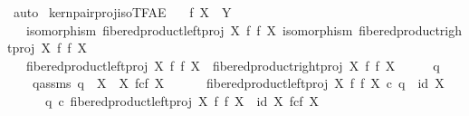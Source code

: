 \begin{isabellebody}
\ auto\isanewline
{}\isamarkupfalse%
%
\endisatagproof
{\isafoldproof}%
%
\isadelimproof
\isanewline
%
\endisadelimproof
\isanewline
{}\isamarkupfalse%
\ kern{\isacharunderscore}{\kern0pt}pair{\isacharunderscore}{\kern0pt}proj{\isacharunderscore}{\kern0pt}iso{\isacharunderscore}{\kern0pt}TFAE{}{\isacharcolon}{\kern0pt}\isanewline
\ \ \ {\isachardoublequoteopen}f{\isacharcolon}{\kern0pt}\ X\ {\isasymrightarrow}\ Y{\isachardoublequoteclose}\isanewline
\ \ \ {\isachardoublequoteopen}isomorphism\ {\isacharparenleft}{\kern0pt}fibered{\isacharunderscore}{\kern0pt}product{\isacharunderscore}{\kern0pt}left{\isacharunderscore}{\kern0pt}proj\ X\ f\ f\ X{\isacharparenright}{\kern0pt}{\isachardoublequoteclose}\ {\isachardoublequoteopen}isomorphism\ {\isacharparenleft}{\kern0pt}fibered{\isacharunderscore}{\kern0pt}product{\isacharunderscore}{\kern0pt}right{\isacharunderscore}{\kern0pt}proj\ X\ f\ f\ X{\isacharparenright}{\kern0pt}{\isachardoublequoteclose}\isanewline
\ \ \ {\isachardoublequoteopen}fibered{\isacharunderscore}{\kern0pt}product{\isacharunderscore}{\kern0pt}left{\isacharunderscore}{\kern0pt}proj\ X\ f\ f\ X\ {\isacharequal}{\kern0pt}\ fibered{\isacharunderscore}{\kern0pt}product{\isacharunderscore}{\kern0pt}right{\isacharunderscore}{\kern0pt}proj\ X\ f\ f\ X{\isachardoublequoteclose}\isanewline
%
\isadelimproof
%
\endisadelimproof
%
\isatagproof
{}\isamarkupfalse%
\ {\isacharminus}{\kern0pt}\isanewline
\ \ \isamarkupfalse%
\ q{}\ \ \isanewline
\ \ \ \ q{}{\isacharunderscore}{\kern0pt}assms{\isacharcolon}{\kern0pt}\ {\isachardoublequoteopen}q{}\ {\isacharcolon}{\kern0pt}\ X\ {\isasymrightarrow}\ X\ \isactrlbsub f\isactrlesub {\isasymtimes}\isactrlsub c\isactrlbsub f\isactrlesub \ X{\isachardoublequoteclose}\isanewline
\ \ \ \ \ \ {\isachardoublequoteopen}fibered{\isacharunderscore}{\kern0pt}product{\isacharunderscore}{\kern0pt}left{\isacharunderscore}{\kern0pt}proj\ X\ f\ f\ X\ {\isasymcirc}\isactrlsub c\ q{}\ {\isacharequal}{\kern0pt}\ id\ X{\isachardoublequoteclose}\isanewline
\ \ \ \ \ \ {\isachardoublequoteopen}q{}\ {\isasymcirc}\isactrlsub c\ fibered{\isacharunderscore}{\kern0pt}product{\isacharunderscore}{\kern0pt}left{\isacharunderscore}{\kern0pt}proj\ X\ f\ f\ X\ {\isacharequal}{\kern0pt}\ id\ {\isacharparenleft}{\kern0pt}X\ \isactrlbsub f\isactrlesub {\isasymtimes}\isactrlsub c\isactrlbsub f\isactrlesub \ X{\isacharparenright}{\kern0pt}{\isachardoublequoteclose}\isanewline

\end{isabellebody}
